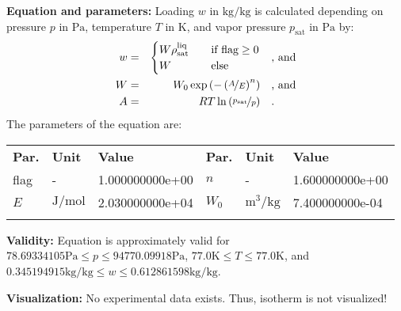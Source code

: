 \textbf{Equation and parameters:}
\newline
%
Loading $w$ in $\si{\kilogram\per\kilogram}$ is calculated depending on pressure $p$ in $\si{\pascal}$, temperature $T$ in $\si{\kelvin}$, and vapor pressure $p_\mathrm{sat}$ in $\si{\pascal}$ by:
%
\begin{equation*}
\begin{split}
w &=& \begin{cases} W \rho_\mathrm{sat}^{\mathrm{liq}} & \quad \text{if flag} \geq 0 \\ W & \quad \text{else} \end{cases} & \quad\text{, and} \\
W &=& W_0 \exp \left( - \left( \nicefrac{A}{E} \right) ^{n} \right) & \quad\text{, and} \\
A &=& R T \ln \left( \nicefrac{p_\mathrm{sat}}{p} \right) & \quad\text{.} \\
\end{split}
\end{equation*}
%
The parameters of the equation are:
%
\begin{longtable}[l]{lll|lll}
\toprule
\addlinespace
\textbf{Par.} & \textbf{Unit} & \textbf{Value} &	\textbf{Par.} & \textbf{Unit} & \textbf{Value} \\
\addlinespace
\midrule
\endhead

\bottomrule
\endfoot
\bottomrule
\endlastfoot
\addlinespace

flag & - & 1.000000000e+00 & $n$ & - & 1.600000000e+00 \\
$E$ & $\si{\joule\per\mole}$ & 2.030000000e+04 & $W_0$ & $\si{\cubic\meter\per\kilogram}$ & 7.400000000e-04 \\

\addlinespace\end{longtable}

\textbf{Validity:}
\newline
Equation is approximately valid for $78.69334105 \si{\pascal} \leq p \leq 94770.09918 \si{\pascal}$,  $77.0 \si{\kelvin} \leq T \leq 77.0 \si{\kelvin}$, and $0.345194915 \si{\kilogram\per\kilogram} \leq w \leq 0.612861598 \si{\kilogram\per\kilogram}$.
\newline

\textbf{Visualization:}
%
\newline
No experimental data exists. Thus, isotherm is not visualized!
%

\FloatBarrier
\newpage
